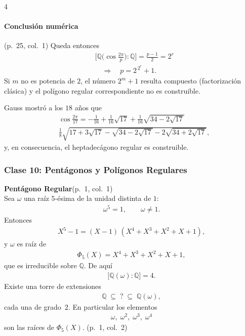 \documentclass[landscape,a4paper]{article}
\begin{document}
\begin{multicols}{4}
\paragraph{Conclusión numérica} (p.~25, col.~1)
Queda entonces
\begin{align*}
  &\bigl[\mathbb{Q}\bigl(\cos\tfrac{2\pi}{p}\bigr):\mathbb{Q}\bigr] = \frac{p-1}{2} = 2^{r}\\ &\quad\Longrightarrow\quad p = 2^{\,2^{r}} + 1.
\end{align*}
Si $m$ no es potencia de $2$, el número $2^{m}+1$ resulta compuesto (factorización clásica) y el polígono regular correspondiente no es construible.

Gauss mostró a los $18$ años que
\begin{align*}
  &\cos\frac{2\pi}{17} = -\frac{1}{16}+\frac{1}{16}\sqrt{17}+\frac{1}{16}\sqrt{34-2\sqrt{17}}\\
  &\frac{1}{8}\sqrt{17+3\sqrt{17}-\sqrt{34-2\sqrt{17}}-2\sqrt{34+2\sqrt{17}}},
\end{align*}
y, en consecuencia, el heptadecágono regular es construible.
\subsubsection*{Clase 10: Pentágonos y Polígonos Regulares}
\noindent\textbf{Pentágono Regular}\hfill (p.~1, col.~1)\\
Sea $\omega$ una raíz $5$‑ésima de la unidad distinta de $1$:
\begin{align*}
\omega^{5}=1,\qquad \omega\neq 1.
\end{align*}
Entonces
\begin{align*}
X^{5}-1=(X-1)\,(X^{4}+X^{3}+X^{2}+X+1),
\end{align*}
y $\omega$ es raíz de 
\begin{align*}
\Phi_{5}(X)=X^{4}+X^{3}+X^{2}+X+1,
\end{align*}
que es irreducible sobre $\mathbb{Q}$.  De aquí
\begin{align*}
\bigl[\mathbb{Q}(\omega):\mathbb{Q}\bigr]=4.
\end{align*}
Existe una torre de extensiones
\begin{align*}
\mathbb{Q}\;\subseteq\; ?\;\subseteq\;\mathbb{Q}(\omega),
\end{align*}
cada una de grado~$2$.  En particular los elementos
\begin{align*}
\omega,\;\omega^{2},\;\omega^{3},\;\omega^{4}
\end{align*}
son las raíces de $\Phi_{5}(X)$.  (p.~1, col.~2)


\end{multicols}
\end{document}
